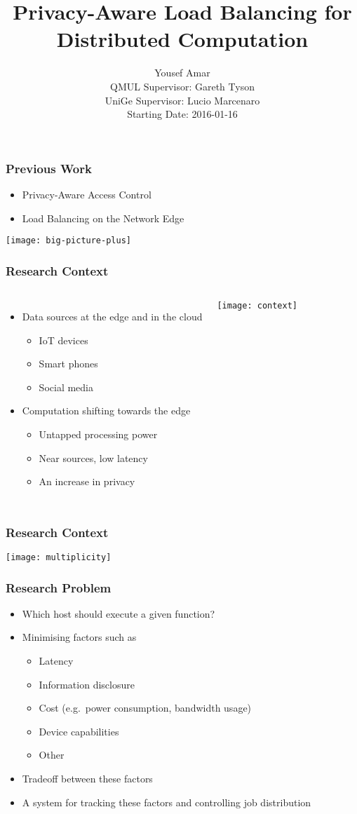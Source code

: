 \documentclass[aspectratio=169]{beamer}
\title{\Huge Privacy-Aware Load Balancing for Distributed Computation}
\author{\Large Yousef Amar\\%
\small QMUL Supervisor: Gareth Tyson\\%
UniGe Supervisor: Lucio Marcenaro\\%
Starting Date: 2016-01-16%
}
\date{}
\begin{document}
\frame{\titlepage}

\begin{frame}
	\frametitle{Previous Work}
	\begin{itemize}
		\item Privacy-Aware Access Control
		\item Load Balancing on the Network Edge
	\end{itemize}
	\texttt{[image: big-picture-plus]}
\end{frame}

\begin{frame}
	\frametitle{Research Context}
	\begin{columns}[c]

		\begin{itemize}
			\item Data sources at the edge and in the cloud
			\begin{itemize}
				\item IoT devices
				\item Smart phones
				\item Social media
			\end{itemize}
			\item Computation shifting towards the edge
			\begin{itemize}
				\item Untapped processing power
				\item Near sources, low latency
				\item An increase in privacy
			\end{itemize}
		\end{itemize}

		\texttt{[image: context]}

	\end{columns}
\end{frame}

\begin{frame}
	\frametitle{Research Context}
	\texttt{[image: multiplicity]}
\end{frame}

\begin{frame}
	\frametitle{Research Problem}
	\begin{itemize}
		\item Which host should execute a given function?
		\item Minimising factors such as
		\begin{itemize}
			\item Latency
			\item Information disclosure
			\item Cost (e.g.\ power consumption, bandwidth usage)
			\item Device capabilities
			\item Other
		\end{itemize}
		\item Tradeoff between these factors
		\item A system for tracking these factors and controlling job distribution
	\end{itemize}
\end{frame}
\end{document}
